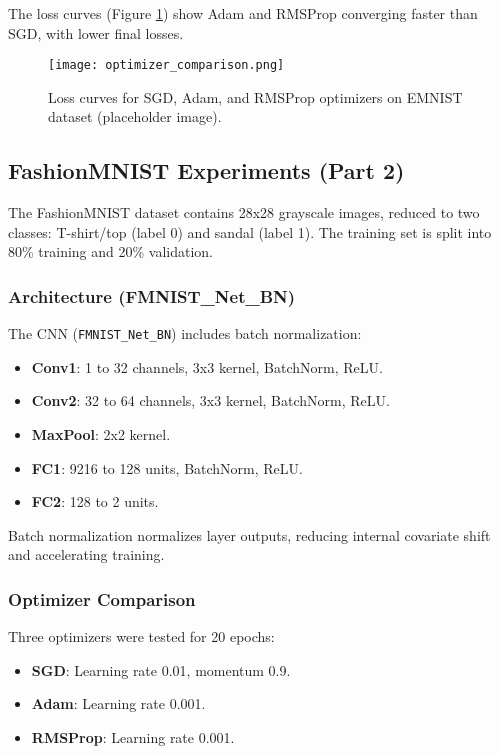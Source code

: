 \documentclass{article}
\begin{document}
The loss curves (Figure \ref{fig:optimizer_comparison}) show Adam and RMSProp converging faster than SGD, with lower final losses.

\begin{figure}[ht]
    \centering
    \texttt{[image: optimizer\_comparison.png]}
    \caption{Loss curves for SGD, Adam, and RMSProp optimizers on EMNIST dataset (placeholder image).}
    \label{fig:optimizer_comparison}
\end{figure}

\subsection{FashionMNIST Experiments (Part 2)}
The FashionMNIST dataset contains 28x28 grayscale images, reduced to two classes: T-shirt/top (label 0) and sandal (label 1). The training set is split into 80\% training and 20\% validation.

\subsubsection{Architecture (FMNIST\_Net\_BN)}
The CNN (\texttt{FMNIST\_Net\_BN}) includes batch normalization:
\begin{itemize}
    \item \textbf{Conv1}: 1 to 32 channels, 3x3 kernel, BatchNorm, ReLU.
    \item \textbf{Conv2}: 32 to 64 channels, 3x3 kernel, BatchNorm, ReLU.
    \item \textbf{MaxPool}: 2x2 kernel.
    \item \textbf{FC1}: 9216 to 128 units, BatchNorm, ReLU.
    \item \textbf{FC2}: 128 to 2 units.
\end{itemize}

Batch normalization normalizes layer outputs, reducing internal covariate shift and accelerating training.

\subsubsection{Optimizer Comparison}
Three optimizers were tested for 20 epochs:
\begin{itemize}
    \item \textbf{SGD}: Learning rate 0.01, momentum 0.9.
    \item \textbf{Adam}: Learning rate 0.001.
    \item \textbf{RMSProp}: Learning rate 0.001.
\end{itemize}
\end{document}
